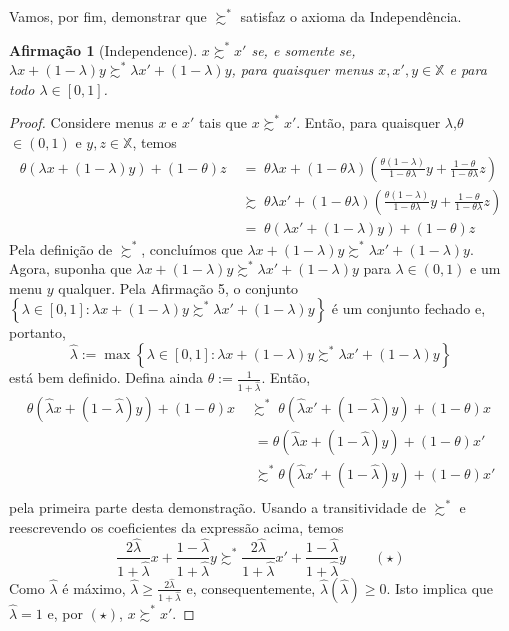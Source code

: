 \documentclass[11pt, a4paper]{article}
\theoremstyle{nonumberplain}
\newtheorem{proof}{Dem.}
\theoremstyle{plain}
\theoremstyle{plain}
\newtheorem{claim}{Afirmação}
\theoremstyle{plain}
\begin{document}
Vamos, por fim, demonstrar que $\succsim^*$ satisfaz o axioma da Independência. 

\begin{claim}[Independence] $x\succsim^*x'$ se, e somente se, $\lambda x + (1-\lambda)y\succsim^* \lambda x' + (1-\lambda)y$, para quaisquer menus $x,x',y\in \mathbb{X}$ e para todo $\lambda \in [0,1]$.\end{claim}
\begin{proof}
Considere menus $x$ e $x'$ tais que $x\succsim^* x'$. Então, para quaisquer $\lambda$,$\theta$ $\in (0,1)$ e $y,z\in\mathbb{X}$, temos
\begin{align*}
\theta(\lambda x + (1-\lambda)y)+(1-\theta)z \;&=\; \theta\lambda x + (1-\theta\lambda)\left(\frac{\theta(1-\lambda)}{1-\theta\lambda}y+\frac{1-\theta}{1-\theta\lambda}z\right)\\
&\succsim\;  \theta\lambda x' + (1-\theta\lambda)\left(\frac{\theta(1-\lambda)}{1-\theta\lambda}y+\frac{1-\theta}{1-\theta\lambda}z\right)\\
&=\; \theta(\lambda x' + (1-\lambda)y)+(1-\theta)z
\end{align*}
Pela definição de $\succsim^*$, concluímos que $\lambda x + (1-\lambda)y\succsim^*\lambda x' + (1-\lambda)y$. 
Agora, suponha que $\lambda x + (1-\lambda)y\succsim^*\lambda x' + (1-\lambda)y$ para $\lambda\in(0,1)$ e um menu $y$ qualquer. Pela Afirmação 5, o conjunto $\left\{\lambda\in[0,1]:\lambda x + (1-\lambda)y\succsim^*\lambda x' + (1-\lambda)y\right\}$ é um conjunto fechado e, portanto, $$\hat{\lambda}:=\max\left\{\lambda\in[0,1]:\lambda x + (1-\lambda)y\succsim^*\lambda x' + (1-\lambda)y\right\}$$ está bem definido. Defina ainda $\theta:=\frac{1}{1+\hat{\lambda}}$. Então,
\begin{align*}
\theta(\hat{\lambda}x+(1-\hat{\lambda})y)+(1-\theta)x\;&\succsim^*\;\theta(\hat{\lambda}x'+(1-\hat{\lambda})y)+(1-\theta)x\\
&\;= \theta(\hat{\lambda}x+(1-\hat{\lambda})y)+(1-\theta)x'\\
&\;\succsim^* \theta(\hat{\lambda}x'+(1-\hat{\lambda})y)+(1-\theta)x'\\  
\end{align*} pela primeira parte desta demonstração. Usando a transitividade de $\succsim^*$ e reescrevendo os coeficientes da expressão acima, temos $$\frac{2\hat{\lambda}}{1+\hat{\lambda}}x+\frac{1-\hat{\lambda}}{1+\hat{\lambda}}y \succsim^* \frac{2\hat{\lambda}}{1+\hat{\lambda}}x'+\frac{1-\hat{\lambda}}{1+\hat{\lambda}}y \qquad (\star)$$ Como $\hat{\lambda}$ é máximo, $\hat{\lambda}\geq \frac{2\hat{\lambda}}{1+\hat{\lambda}}$ e, consequentemente, $\hat{\lambda}(\hat{\lambda})\geq 0$. Isto implica que $\hat{\lambda}=1$ e, por $(\star)$, $x\succsim^* x'$.
\end{proof}
\end{document}
